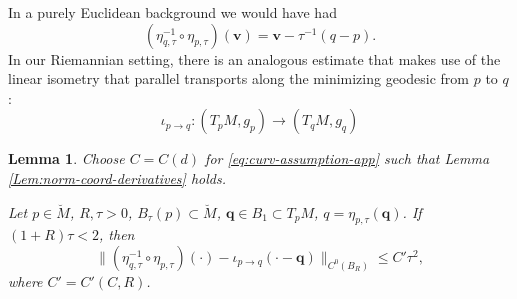 \documentclass[11pt, letterpaper, reqno]{amsart}
\numberwithin{equation}{section}
\newtheorem{Lem}[Def]{Lemma}
\theoremstyle{remark}
\newcommand{\mbfq}{\mathbf{q}}
\newcommand{\mbfv}{\mathbf{v}}
\begin{document}
In a purely Euclidean background we would have had
\[ (\eta_{q,\tau}^{-1} \circ \eta_{p,\tau})(\mbfv) = \mbfv - \tau^{-1} (q-p). \]
In our Riemannian setting, there is an analogous estimate that makes use of the linear isometry that parallel transports along the minimizing geodesic from $p$ to $q$:
\[ \iota_{p\to q} : (T_p M, g_p) \to (T_q M, g_q) \]


\begin{Lem}\label{Lem:change-bspt}
Choose $C=C(d)$ for \eqref{eq:curv-assumption-app} such that Lemma \ref{Lem:norm-coord-derivatives} holds.

Let $p \in \breve M$, $R,\tau > 0$, $B_\tau(p) \subset \breve M$, $\mbfq \in B_1 \subset T_p M$, $q = \eta_{p,\tau}(\mbfq)$. If $(1+R)\tau < 2$, then 
\[ \|(\eta_{q,\tau}^{-1} \circ \eta_{p,\tau})(\cdot) - \iota_{p \to q}(\cdot - \mbfq) \|_{C^0(B_R)} \leq C'\tau^2, \]
where $C' = C'(C, R)$.\end{Lem}
\end{document}
